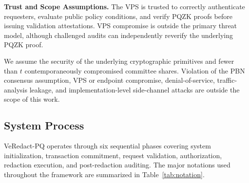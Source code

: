 \documentclass[lettersize,journal]{IEEEtran}
\begin{document}
\medskip
\noindent\textbf{Trust and Scope Assumptions.}
The VPS is trusted to correctly authenticate requesters, evaluate
public policy conditions, and verify PQZK proofs before issuing
validation attestations. VPS compromise is outside the primary threat
model, although challenged audits can independently reverify the
underlying PQZK proof.

We assume the security of the underlying cryptographic primitives and
fewer than $t$ contemporaneously compromised committee shares.
Violation of the PBN consensus assumption, VPS or endpoint compromise,
denial-of-service, traffic-analysis leakage, and implementation-level
side-channel attacks are outside the scope of this work.
  \subsection{System Process}

VeRedact-PQ operates through six sequential phases covering system
initialization, transaction commitment, request validation, authorization,
redaction execution, and post-redaction auditing. The major notations
used throughout the framework are summarized in
Table~\ref{tab:notation}.
\end{document}
